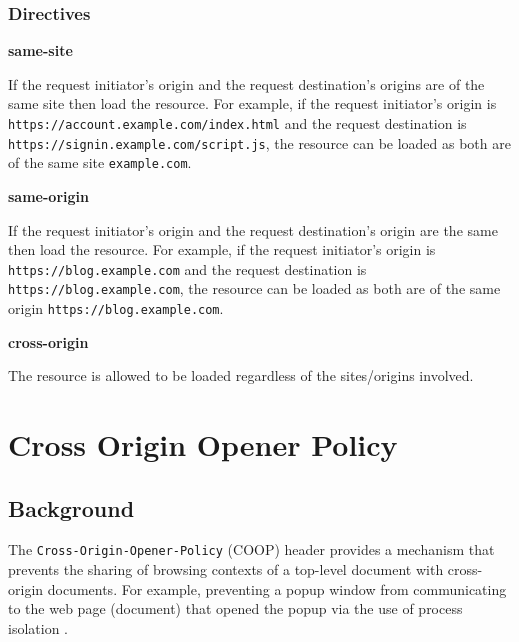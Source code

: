 \documentclass{mscreport}
\begin{document}
\subsubsection{Directives}
\textbf{same-site}

\vspace{0.3cm} \noindent
If the request initiator's origin and the request destination's origins are of the same site then load the resource. For example, if the request initiator's origin is \newline \texttt{https://account.example.com/index.html} and the request destination is \newline \texttt{https://signin.example.com/script.js}, the resource can be loaded as both are of the same site \texttt{example.com}.

\vspace{0.7cm} \noindent
\textbf{same-origin}

\vspace{0.3cm} \noindent
If the request initiator’s origin and the request destination’s origin are the same then load the resource. For example, if the request initiator’s origin is \texttt{https://blog.example.com} and the request destination is \texttt{https://blog.example.com}, the resource can be loaded as both are of the same origin \texttt{https://blog.example.com}.

\vspace{0.7cm} \noindent
\textbf{cross-origin}

\vspace{0.3cm} \noindent
The resource is allowed to be loaded regardless of the sites/origins involved.

\newpage


\section{Cross Origin Opener Policy}
\label{section:coop}

\subsection{Background}

The \texttt{Cross-Origin-Opener-Policy} (COOP) header provides a mechanism that prevents the sharing of browsing contexts of a top-level document with cross-origin documents. For example, preventing a popup window from communicating to the web page (document) that opened the popup via the use of process isolation \cite{Apple_undated-gj}.
\end{document}
